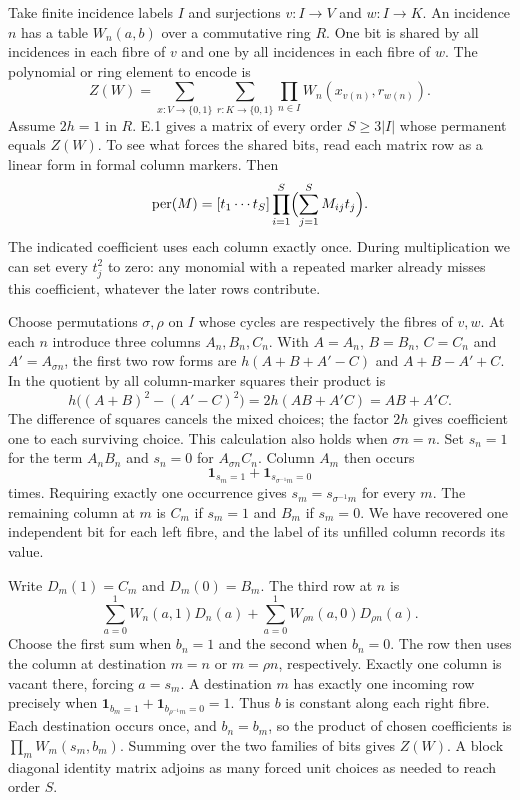 \newpage
{}\label{sec:perm}
Take finite incidence labels $I$ and surjections $v:I\to V$ and $w:I\to K$.
An incidence $n$ has a table $W_n(a,b)$ over a commutative ring $R$.
One bit is shared by all incidences in each fibre of $v$ and one by all
incidences in each fibre of $w$. The polynomial or ring element to encode is
\[
  Z(W)=\sum_{x:V\to\{0,1\}}\sum_{r:K\to\{0,1\}}
           \prod_{n\in I}W_n(x_{v(n)},r_{w(n)}).
\]
Assume $2h=1$ in $R$. E.1 gives a matrix of every order $S\ge3|I|$
whose permanent equals $Z(W)$. To see what forces the shared bits, read
each matrix row as a linear form in formal column markers. Then
\[
 \operatorname{per}(M)=
 [t_1\cdots t_S]\prod_{i=1}^S\Bigl(\sum_{j=1}^SM_{ij}t_j\Bigr).
\]
The indicated coefficient uses each column exactly once. During
multiplication we can set every $t_j^2$ to zero: any monomial with a
repeated marker already misses this coefficient, whatever the later rows
contribute.

Choose permutations $\sigma,\rho$ on $I$ whose cycles are respectively
the fibres of $v,w$. At each $n$ introduce three columns $A_n,B_n,C_n$.
With $A=A_n$, $B=B_n$, $C=C_n$ and $A'=A_{\sigma n}$, the first two row
forms are $h(A+B+A'-C)$ and $A+B-A'+C$. In the quotient by all
column-marker squares their product is
\[
 h\bigl((A+B)^2-(A'-C)^2\bigr)
       =2h(AB+A'C)=AB+A'C .
\]
The difference of squares cancels the mixed choices; the factor $2h$
gives coefficient one to each surviving choice. This calculation also
holds when $\sigma n=n$. Set $s_n=1$ for the term $A_nB_n$ and $s_n=0$
for $A_{\sigma n}C_n$. Column $A_m$ then occurs
\[
  \mathbf{1}_{s_m=1}+\mathbf{1}_{s_{\sigma^{-1}m}=0}
\]
times. Requiring exactly one occurrence gives $s_m=s_{\sigma^{-1}m}$
for every $m$. The remaining column at $m$ is $C_m$ if $s_m=1$ and
$B_m$ if $s_m=0$. We have recovered one independent bit for each left
fibre, and the label of its unfilled column records its value.


\newpage
{}
Write $D_m(1)=C_m$ and $D_m(0)=B_m$. The third row at $n$ is
\[
 \sum_{a=0}^1 W_n(a,1)D_n(a) +
 \sum_{a=0}^1 W_{\rho n}(a,0)D_{\rho n}(a).
\]
Choose the first sum when $b_n=1$ and the second when $b_n=0$. The row
then uses the column at destination $m=n$ or $m=\rho n$, respectively.
Exactly one column is vacant there, forcing $a=s_m$. A destination $m$
has exactly one incoming row precisely when
$\mathbf{1}_{b_m=1}+\mathbf{1}_{b_{\rho^{-1}m}=0}=1$.
Thus $b$ is constant along each right fibre. Each destination occurs
once, and $b_n=b_m$, so the product of chosen coefficients is
$\prod_m W_m(s_m,b_m)$. Summing over the two families of bits gives
$Z(W)$. A block diagonal identity matrix adjoins as many forced
unit choices as needed to reach order $S$.


